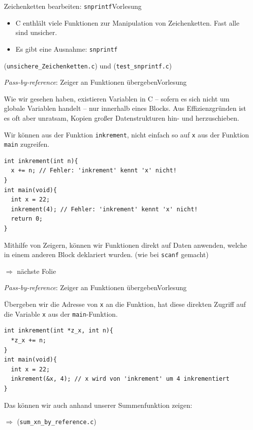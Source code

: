\documentclass[xcolor=dvipsnames]{beamer}
\newcounter{lecturecounter}
\begin{document}
\begin{frame}[fragile]{Zeichenketten bearbeiten: \texttt{snprintf}}{Vorlesung }
  \begin{block}{}
    \begin{itemize}
      \item{C enthlält viele Funktionen zur Manipulation von Zeichenketten. Fast alle sind unsicher.}
      \item{Es gibt eine Ausnahme: \texttt{snprintf}}
    \end{itemize}
  \end{block}
  (\verb|unsichere_Zeichenketten.c|)  und (\verb|test_snprintf.c|)
\end{frame}

\begin{frame}[fragile]{\emph{Pass-by-reference}: Zeiger an Funktionen übergeben}{Vorlesung }
  \begin{block}{}
    Wie wir gesehen haben, existieren Variablen in C -- sofern es sich nicht um globale Variablen handelt -- nur innerhalb eines Blocks. Aus Effizienzgründen ist es oft aber unratsam, Kopien großer Datenstrukturen hin- und herzuschieben.
  \end{block}
  Wir können aus der Funktion \texttt{inkrement}, nicht einfach so auf \texttt{x} aus der Funktion \texttt{main} zugreifen.
  \begin{lstlisting}
int inkrement(int n){
  x += n; // Fehler: 'inkrement' kennt 'x' nicht!
}  
int main(void){
  int x = 22;
  inkrement(4); // Fehler: 'inkrement' kennt 'x' nicht!
  return 0;
} 
\end{lstlisting}
\vspace{-0.4cm}
  \begin{block}{}
    Mithilfe von Zeigern, können wir Funktionen direkt auf Daten anwenden, welche in einem anderen Block deklariert wurden. (wie bei \texttt{scanf} gemacht)
  \end{block}
  $\Rightarrow$  nächste Folie
\end{frame}

\begin{frame}[fragile]{\emph{Pass-by-reference}: Zeiger an Funktionen übergeben}{Vorlesung }
  \begin{block}{}
    Übergeben wir die Adresse von \texttt{x} an die Funktion, hat diese direkten Zugriff auf die Variable \texttt{x} aus der \texttt{main}-Funktion.
  \end{block}
  \begin{lstlisting}
int inkrement(int *z_x, int n){
  *z_x += n;
}  
int main(void){
  int x = 22;
  inkrement(&x, 4); // x wird von 'inkrement' um 4 inkrementiert
}
\end{lstlisting}
\vspace{-0.4cm}
  \begin{block}{}
    Das können wir auch anhand unserer Summenfunktion zeigen:
  \end{block}
  $\Rightarrow$ (\verb|sum_xn_by_reference.c|)
\end{frame}
\end{document}

